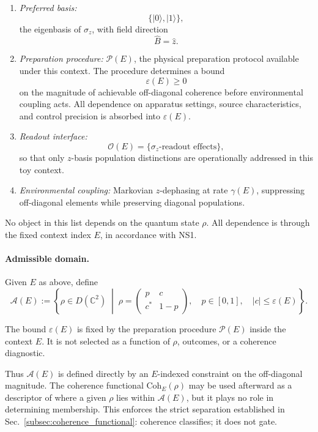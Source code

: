 \documentclass[aps,prx,onecolumn,11pt]{revtex4-2}
\theoremstyle{plain}
\theoremstyle{definition}
\theoremstyle{remark}
\begin{document}
\begin{enumerate}[label=(\roman*), leftmargin=2.2em]

\item \emph{Preferred basis:}
\[
\{|0\rangle,|1\rangle\},
\]
the eigenbasis of \(\sigma_z\), with field direction
\[
\hat B=\hat z.
\]

\item \emph{Preparation procedure:}
\(\mathcal P(E)\), the physical preparation protocol available under
this context. The procedure determines a bound
\[
\varepsilon(E)\geq 0
\]
on the magnitude of achievable off-diagonal coherence before
environmental coupling acts. All dependence on apparatus settings,
source characteristics, and control precision is absorbed into
\(\varepsilon(E)\).

\item \emph{Readout interface:}
\[
\mathcal O(E)=\{\text{\(\sigma_z\)-readout effects}\},
\]
so that only \(z\)-basis population distinctions are operationally
addressed in this toy context.

\item \emph{Environmental coupling:}
Markovian \(z\)-dephasing at rate \(\gamma(E)\), suppressing
off-diagonal elements while preserving diagonal populations.

\end{enumerate}

No object in this list depends on the quantum state \(\rho\). All
dependence is through the fixed context index \(E\), in accordance with
NS1.

\paragraph{Admissible domain.}

Given \(E\) as above, define
\begin{equation}
\mathcal A(E)
:=
\left\{
\rho\in D(\mathbb C^2)
\;\middle|\;
\rho=
\begin{pmatrix}
p & c\\
c^* & 1-p
\end{pmatrix},
\quad
p\in[0,1],
\quad
|c|\leq \varepsilon(E)
\right\}.
\label{eq:zdephasing_admissible_set}
\end{equation}

The bound \(\varepsilon(E)\) is fixed by the preparation procedure
\(\mathcal P(E)\) inside the context \(E\). It is not selected as a
function of \(\rho\), outcomes, or a coherence diagnostic.

Thus \(\mathcal A(E)\) is defined directly by an \(E\)-indexed
constraint on the off-diagonal magnitude. The coherence functional
\(\mathrm{Coh}_E(\rho)\) may be used afterward as a descriptor of where
a given \(\rho\) lies within \(\mathcal A(E)\), but it plays no role in
determining membership. This enforces the strict separation established
in Sec.~\ref{subsec:coherence_functional}: coherence classifies; it
does not gate.
\end{document}
